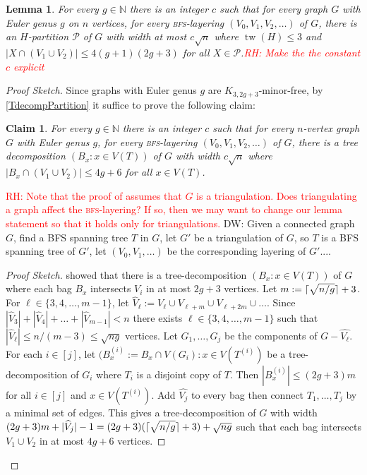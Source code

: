 \documentclass[12pt]{article}
\DeclarePairedDelimiter{\ceil}{\lceil}{\rceil}
\renewcommand{\leq}{\leqslant}
\DeclareMathOperator{\tw}{tw}
\newcommand{\PP}{\mathcal{P}}
\newcommand{\NN}{\mathbb{N}}
\newcommand{\david}[1]{{\color{blue} DW: #1}}
\newcommand{\robert}[1]{\textcolor{red}{RH: #1}}
\theoremstyle{plain}
\newtheorem{lem}[thm]{Lemma}
\newtheorem*{claim}{Claim}
\theoremstyle{definition}
\begin{document}
\begin{lem}\label{bfsPartitionGenus}
    For every $g\in \NN$ there is an integer $c$ such that for every graph $G$ with Euler genus $g$ on $n$ vertices, for every \textsc{bfs}-layering $(V_0,V_1,V_2,\dots)$ of $G$, there is an $H$-partition $\PP$ of $G$ with width at most $c\sqrt{n}$ where $\tw(H)\leq 3$ and $|X\cap (V_1\cup V_2)|\leq 4(g+1)(2g+3)$ for all $X \in \PP$.\robert{Make the the constant $c$ explicit}
\end{lem}

\begin{proof}[Proof Sketch]
    Since graphs with Euler genus $g$ are $K_{3,2g+3}$-minor-free, by \cref{TdecompPartition} it suffice to prove the following claim: 
    
    \begin{claim}
        For every $g\in \NN$ there is an integer $c$ such that for every $n$-vertex graph $G$ with Euler genus $g$, for every \textsc{bfs}-layering $(V_0,V_1,V_2,\dots)$ of $G$, there is a tree decomposition $(B_x\colon x\in V(T))$ of $G$ with width $c\sqrt{n}$ where $|B_x\cap (V_1\cup V_2)|\leq 4g+6$ for all $x\in V(T)$.
    \end{claim}
    \robert{Note that the proof of \citep[Theorem~12]{DMW17} assumes that $G$ is a triangulation. Does triangulating a graph affect the \textsc{bfs}-layering? If so, then we may want to change our lemma statement so that it holds only for triangulations.} \david{Given a connected graph $G$, find a BFS spanning tree $T$ in $G$, let $G'$ be a triangulation of $G$, so $T$ is a BFS spanning tree of $G'$, let $(V_0,V_1,\dots)$ be the corresponding layering of $G'$....}
    
    \begin{proof}[Proof Sketch]
        \citep[Theorem~12]{DMW17} showed that there is a tree-decomposition $(B_x \colon x\in V(T))$ of $G$ where each bag $B_x$ intersects $V_i$ in at most $2g+3$ vertices. Let $m:= \ceil{\sqrt{n/g}}+3$.
	       For $\ell\in\{3,4,\dots,m-1\}$, 
	       let $\widehat{V}_\ell:= V_\ell \cup V_{\ell+m}\cup V_{\ell+2m}\cup\dots$.
	       Since $|\widehat{V}_3|+|\widehat{V}_4|+\dots+|\widehat{V}_{m-1}| < n$ there exists  $\ell\in\{3,4,\dots,m-1\}$ such that $|\widehat{V}_{\ell}|\leq n/(m-3) \leq \sqrt{ng}$ vertices. Let $G_1,\dots,G_j$ be the components of $G-\widehat{V_{\ell}}$. For each $i\in [j]$, let $(B_x^{(i)}:= B_x \cap V(G_i)\colon x\in V(T^{(i)})$ be a tree-decomposition of $G_i$ where $T_i$ is a disjoint copy of $T$. Then $|B_x^{(i)}|\leq (2g+3)m$ for all $i\in [j]$ and $x\in V(T^{(i)})$. Add $\hat{V_j}$ to every bag then connect $T_1,\dots,T_j$ by a minimal set of edges. This gives a tree-decomposition of $G$ with width $(2g+3)m+|\widehat{V}_j|-1=  (2g+3)( \ceil{\sqrt{n/g}}+3)+\sqrt{ng}$ such that each bag intersects $V_1 \cup V_2$ in at most $4g+6$ vertices.
    \end{proof}
\end{proof}
\end{document}
